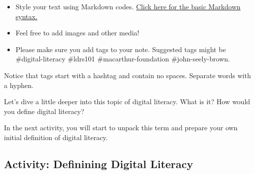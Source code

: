 \documentclass[
]{book}
\providecommand{\tightlist}{%
  \setlength{\itemsep}{0pt}\setlength{\parskip}{0pt}}
\theoremstyle{definition}
\theoremstyle{definition}
\theoremstyle{definition}
\theoremstyle{definition}
\theoremstyle{remark}
\begin{document}
\begin{reflect}
\begin{itemize}
\tightlist
\item
  Style your text using Markdown codes. \href{https://help.obsidian.md/Editing+and+formatting/Basic+formatting+syntax}{Click here for the basic Markdown syntax.}
\item
  Feel free to add images and other media!
\item
  Please make sure you add tags to your note. Suggested tags might be \#digital-literacy \#ldrs101 \#macarthur-foundation \#john-seely-brown.
\end{itemize}

Notice that tags start with a hashtag and contain no spaces. Separate words with a hyphen.
\end{reflect}

Let's dive a little deeper into this topic of digital literacy. What is it? How would you define digital literacy?

In the next activity, you will start to unpack this term and prepare your own initial definition of digital literacy.

\hypertarget{activity-definining-digital-literacy}{%
\subsection*{Activity: Definining Digital Literacy}\label{activity-definining-digital-literacy}}
\end{document}
